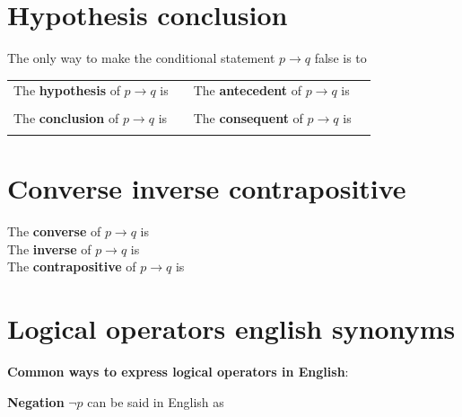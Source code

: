 \documentclass[12pt, oneside]{article}
\begin{document}
\begin{flushright}
\end{flushright} \section*{Hypothesis conclusion}


The only way to make  the conditional statement $p \to q$ false is to \underline{\phantom{\hspace{3in}}}\\

\begin{tabular}{llll}
The {\bf  hypothesis}  of $p \to q$ is  &\underline{\phantom{\hspace{1in}}} &
The {\bf  antecedent}  of $p \to q$ is  &\underline{\phantom{\hspace{1in}}} \\
&&&  \\
The {\bf  conclusion}  of $p \to q$ is & \underline{\phantom{\hspace{1in}}}&
The {\bf  consequent}  of $p \to q$ is & \underline{\phantom{\hspace{1in}}}\\
&&&  \\
\end{tabular}
 \vfill
\section*{Converse inverse contrapositive}


The {\bf converse}  of $p \to q$ is \underline{}\\

The {\bf inverse}  of $p \to q$ is \underline{}\\

The {\bf contrapositive}  of $p \to q$ is \underline{} \\
 \vfill
\section*{Logical operators english synonyms}


{\bf Common ways to express logical operators in English}:

{\bf Negation} $\lnot p$ can be said in English as 
\end{document}
